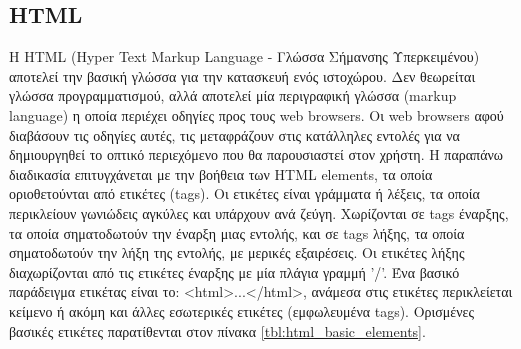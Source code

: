 \subsection{HTML}
Η HTML (Hyper Text Markup Language - Γλώσσα Σήμανσης Υπερκειμένου) αποτελεί την βασική γλώσσα για την κατασκευή ενός ιστοχώρου. Δεν θεωρείται γλώσσα προγραμματισμού, αλλά αποτελεί μία περιγραφική γλώσσα (markup language) η οποία περιέχει οδηγίες προς τους web browsers. Οι web browsers αφού διαβάσουν τις οδηγίες αυτές, τις μεταφράζουν στις κατάλληλες εντολές για να δημιουργηθεί το οπτικό περιεχόμενο που θα παρουσιαστεί στον χρήστη. Η παραπάνω διαδικασία επιτυγχάνεται με την βοήθεια των HTML elements, τα οποία οριοθετούνται από ετικέτες (tags). Οι ετικέτες είναι γράμματα ή λέξεις, τα οποία περικλείουν γωνιώδεις αγκύλες και υπάρχουν ανά ζεύγη. Χωρίζονται σε tags έναρξης, τα οποία σηματοδωτούν την έναρξη μιας εντολής, και σε tags λήξης, τα οποία σηματοδωτούν την λήξη της εντολής, με μερικές εξαιρέσεις. Οι ετικέτες λήξης διαχωρίζονται από τις ετικέτες έναρξης με μία πλάγια γραμμή '/'. Ένα βασικό παράδειγμα ετικέτας είναι το: <html>...</html>, ανάμεσα στις ετικέτες περικλείεται κείμενο ή ακόμη και άλλες εσωτερικές ετικέτες (εμφωλευμένα tags). Ορισμένες βασικές ετικέτες παρατίθενται στον πίνακα \ref{tbl:html_basic_elements}.

